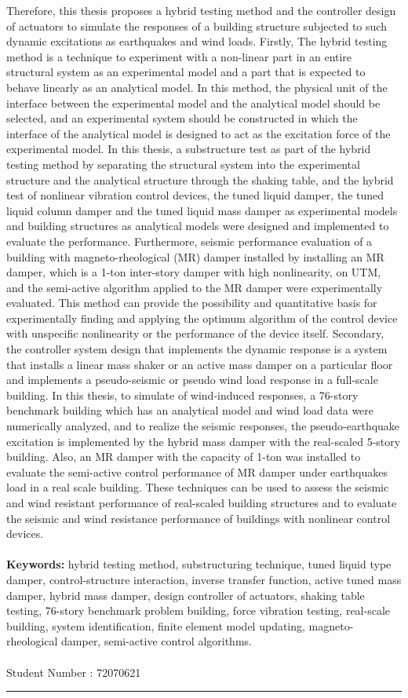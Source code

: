 Therefore, this thesis proposes a hybrid testing method and the controller design of actuators to simulate the responses of a building structure subjected to such dynamic excitations as earthquakes and wind loads. Firstly, The hybrid testing method is a technique to experiment with a non-linear part in an entire structural system as an experimental model and a part that is expected to behave linearly as an analytical model. In this method, the physical unit of the interface between the experimental model and the analytical model should be selected, and an experimental system should be constructed in which the interface of the analytical model is designed to act as the excitation force of the experimental model. In this thesis, a substructure test as part of the hybrid testing method by separating the structural system into the experimental structure and the analytical structure through the shaking table, and the hybrid test of nonlinear vibration control devices, the tuned liquid damper, the tuned liquid column damper and the tuned liquid mass damper as experimental models and building structures as analytical models were designed and implemented to evaluate the performance. Furthermore, seismic performance evaluation of a building with magneto-rheological (MR) damper installed by installing an MR damper, which is a 1-ton inter-story damper with high nonlinearity, on UTM, and the semi-active algorithm applied to the MR damper were experimentally evaluated. This method can provide the possibility and quantitative basis for experimentally finding and applying the optimum algorithm of the control device with unspecific nonlinearity or the performance of the device itself. Secondary, the controller system design that implements the dynamic response is a system that installs a linear mass shaker or an active mass damper on a particular floor and implements a pseudo-seismic or pseudo wind load response in a full-scale building. In this thesis, to simulate of wind-induced responses, a 76-story benchmark building which has an analytical model and wind load data were numerically analyzed, and to realize the seismic responses, the pseudo-earthquake excitation is implemented by the hybrid mass damper with the real-scaled 5-story building. Also, an MR damper with the capacity of 1-ton was installed to evaluate the semi-active control performance of MR damper under earthquakes load in a real scale building. These techniques can be used to assess the seismic and wind resistant performance of real-scaled building structures and to evaluate the seismic and wind resistance performance of buildings with nonlinear control devices.
\\
\\
{\large\textbf{Keywords:}}
hybrid testing method, substructuring technique, tuned liquid type damper, control-structure interaction, inverse transfer function, active tuned mass damper, hybrid mass damper, design controller of actuators, shaking table testing, 76-story benchmark problem building, force vibration testing, real-scale building, system identification, finite element model updating, magneto-rheological damper, semi-active control algorithms.
\\
\\
Student Number : 72070621\\
\noindent\rule[2pt]{\textwidth}{0.5pt}
